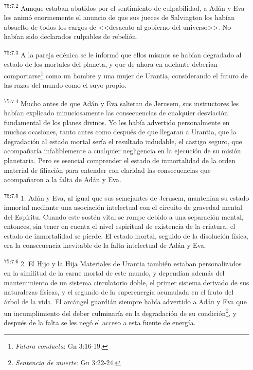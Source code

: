 \par
\textsuperscript{75:7.2} Aunque estaban abatidos por el sentimiento de culpabilidad, a Adán y Eva les animó enormemente el anuncio de que sus jueces de Salvington los habían absuelto de todos los cargos de <<desacato al gobierno del universo>>. No habían sido declarados culpables de rebelión.

\par
\textsuperscript{75:7.3} A la pareja edénica se le informó que ellos mismos se habían degradado al estado de los mortales del planeta, y que de ahora en adelante deberían comportarse\footnote{\textit{Futura conducta}: Gn 3:16-19.} como un hombre y una mujer de Urantia, considerando el futuro de las razas del mundo como el suyo propio.

\par
\textsuperscript{75:7.4} Mucho antes de que Adán y Eva salieran de Jerusem, sus instructores les habían explicado minuciosamente las consecuencias de cualquier desviación fundamental de los planes divinos. Yo les había advertido personalmente en muchas ocasiones, tanto antes como después de que llegaran a Urantia, que la degradación al estado mortal sería el resultado indudable, el castigo seguro, que acompañaría infaliblemente a cualquier negligencia en la ejecución de su misión planetaria. Pero es esencial comprender el estado de inmortalidad de la orden material de filiación para entender con claridad las consecuencias que acompañaron a la falta de Adán y Eva.

\par
\textsuperscript{75:7.5} 1. Adán y Eva, al igual que sus semejantes de Jerusem, mantenían su estado inmortal mediante una asociación intelectual con el circuito de gravedad mental del Espíritu. Cuando este sostén vital se rompe debido a una separación mental, entonces, sin tener en cuenta el nivel espiritual de existencia de la criatura, el estado de inmortalidad se pierde. El estado mortal, seguido de la disolución física, era la consecuencia inevitable de la falta intelectual de Adán y Eva.

\par
\textsuperscript{75:7.6} 2. El Hijo y la Hija Materiales de Urantia también estaban personalizados en la similitud de la carne mortal de este mundo, y dependían además del mantenimiento de un sistema circulatorio doble, el primer sistema derivado de sus naturalezas físicas, y el segundo de la superenergía acumulada en el fruto del árbol de la vida. El arcángel guardián siempre había advertido a Adán y Eva que un incumplimiento del deber culminaría en la degradación de su condición\footnote{\textit{Sentencia de muerte}: Gn 3:22-24.}, y después de la falta se les negó el acceso a esta fuente de energía.

